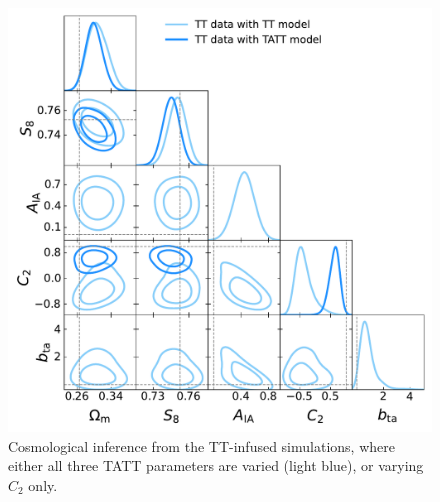 \begin{figure}
\includegraphics[width=\columnwidth]{graphs/TT_combo.pdf}
\caption{Cosmological inference from the TT-infused simulations, where either all three TATT parameters are varied (light blue), or varying $C_2$ only.}
\label{fig:triangle_tt_combo}
\end{figure}